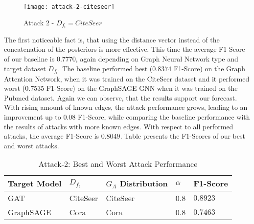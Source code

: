             \begin{figure}[h]
                \begin{center}
                    \texttt{[image: attack-2-citeseer]}
                    \caption{Attack 2 - $D_{f_t} = CiteSeer$}
                    \label{figure:eval-att2-citeseer}
                \end{center}
            \end{figure}

            The first noticeable fact is, that using the distance vector instead of the concatenation of the posteriors is more effective.
            This time the average F1-Score of our baseline is $0.7770$, again depending on Graph Neural Network type and target dataset $D_{f_t}$.
            The baseline performed best ($0.8374$ F1-Score) on the Graph Attention Network, when it was trained on the CiteSeer dataset and it performed worst ($0.7535$ F1-Score) on the GraphSAGE GNN when it was trained on the Pubmed dataset.
            Again we can observe, that the results support our forecast.
            With rising amount of known edges, the attack performance grows, leading to an improvement up to $0.08$ F1-Score, while comparing the baseline performance with the results of attacks with more known edges.
            With respect to all performed attacks, the average F1-Score is $0.8049$.
            Table  presents the F1-Scores of our best and worst attacks.
            
            \vspace{0.48cm}
            \begin{table}[!h]
                \centering
                \footnotesize
                \begin{tabular}{l|l|l|l|l|}
                \toprule
                Target Model & $D_{f_t}$ & $G_A$ Distribution & $\alpha$ & F1-Score \\
                \midrule
                GAT       & CiteSeer & CiteSeer & 0.8 & $0.8923$ \\
                GraphSAGE & Cora     & Cora     & 0.8 & $0.7463$ \\
                
                \bottomrule
                \end{tabular}
                \caption{Attack-2: Best and Worst Attack Performance}
                \label{table:attack2-best-and-worst-performance}
            \end{table}

